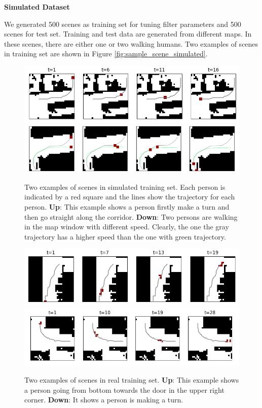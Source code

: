 \textbf{Simulated Dataset}

We generated 500 scenes as training set for tuning filter parameters and 500 scenes for test set. Training and test data are generated from different maps. In these scenes, there are either one or two walking humans. Two examples of scenes in training set are shown in Figure \ref{fig:sample_scene_simulated}.

\begin{figure}[hp]
  \centering
  \includegraphics[width=.99\textwidth]{figures/simulated_dataset_1_persons_with_traj.png}
    \includegraphics[width=\textwidth]{figures/simulated_dataset_2_persons_with_traj.png}
    \caption[Two examples of scenes in simulated training set.]{Two examples of scenes in simulated training set. Each person is indicated by a red square and the lines show the trajectory for each person. \textbf{Up}: This example shows a person firstly make a turn and then go straight along the corridor. \textbf{Down}: Two persons are walking in the map window with different speed. Clearly, the one the gray trajectory has a higher speed than the one with green trajectory.}
    \label{fig:sample_scene_simulated}

    \vspace*{\floatsep}

    \includegraphics[width=.98\textwidth]{figures/real_dataset_1_persons_1_crop.png}
    \includegraphics[width=\textwidth]{figures/real_dataset_1_persons_crop.png}
    \caption[Two examples of scenes in real training set.]{Two examples of scenes in real training set. \textbf{Up}: This example shows a person going from bottom towards the door in the upper right corner. \textbf{Down}: It shows a person is making a turn. }
    \label{fig:sample_scene_real}


\end{figure}


